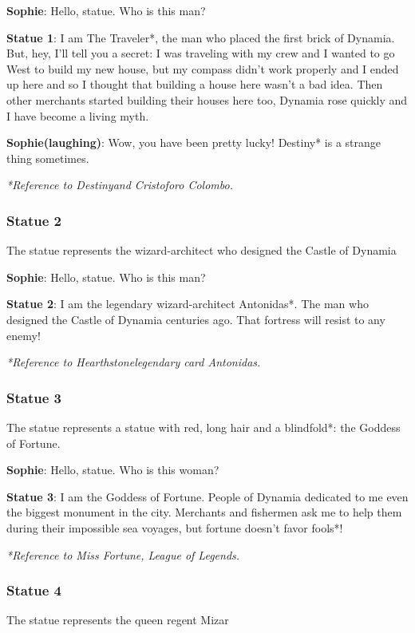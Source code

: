 \textbf{Sophie}: Hello, statue. Who is this man?

\textbf{Statue 1}: I am The Traveler*, the man who placed the first brick of Dynamia. But, hey, I'll tell you a secret: I was traveling with my crew and I wanted to go West to build my new house, but my compass didn't work properly and I ended up here and so I thought that building a house here wasn't a bad idea. Then other merchants started building their houses here too, Dynamia rose quickly and I have become a living myth.

\textbf{Sophie(laughing)}: Wow, you have been pretty lucky! Destiny* is a strange thing sometimes.

\textit{*Reference to Destiny\texttrademark and Cristoforo Colombo.}

\subsubsection*{Statue 2}
The statue represents the wizard-architect who designed the Castle of Dynamia

\textbf{Sophie}: Hello, statue. Who is this man?

\textbf{Statue 2}: I am the legendary wizard-architect Antonidas*. The man who designed the Castle of Dynamia centuries ago. That fortress will resist to any enemy!


\textit{*Reference to Hearthstone\texttrademark legendary card Antonidas.}

\subsubsection*{Statue 3}
The statue represents a statue with red, long hair and a blindfold*: the Goddess of Fortune.

\textbf{Sophie}: Hello, statue. Who is this woman?

\textbf{Statue 3}: I am the Goddess of Fortune. People of Dynamia dedicated to me even the biggest monument in the city. Merchants and fishermen ask me to help them during their impossible sea voyages, but fortune doesn't favor fools*!

\textit{*Reference to Miss Fortune, League of Legends\texttrademark{}.}

\subsubsection*{Statue 4}
The statue represents the queen regent Mizar

